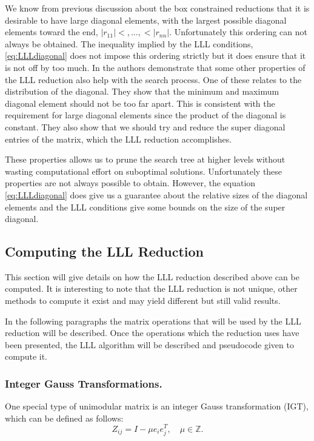 \documentclass[12pt,Bold,letterpaper]{mcgilletdclass}
\newcommand{\vsp}{\vspace{\baselineskip}}
\begin{document}
We know from previous discussion
about the box constrained reductions that it is desirable to have large diagonal
elements, with the largest possible diagonal elements toward the end, $|r_{11}|
<, \dots,< |r_{nn}|$. Unfortunately this ordering can not always be obtained. The inequality implied by the LLL conditions, \eqref{eq:LLLdiagonal} does not impose this ordering strictly but it does ensure that it is not off by too much. In \cite{XieCB11} the authors demonstrate that some other properties of the LLL reduction also help with the search process. One of these relates to the distribution of the diagonal. They show that the minimum and maximum diagonal element should not be too far apart. This is consistent with the requirement for large diagonal elements since the product of the diagonal is constant. They also show that we should try and reduce the super diagonal entries of the matrix, which the LLL reduction accomplishes. 

These properties allows us to prune the search
tree at higher levels without wasting computational effort on suboptimal
solutions. Unfortunately these properties are not always possible to obtain.
However, the equation \eqref{eq:LLLdiagonal} does give us a guarantee about the
relative sizes of the diagonal elements and the LLL conditions give some bounds
on the size of the super diagonal.

\vsp \subsection{Computing the LLL Reduction}

This section will give details on how the LLL reduction described above can be
computed. It is interesting to note that the LLL reduction is not unique, other
methods to compute it exist and may yield different but still valid results.

In the following paragraphs the matrix operations that will be used by the LLL
reduction will be described. Once the operations which the reduction uses have
been presented, the LLL algorithm will be described and pseudocode given to
compute it.

\vsp \subsubsection{Integer Gauss Transformations.} \label{subsec:IGT}

One special type of unimodular matrix is an integer Gauss transformation (IGT), which can be defined as follows:
\begin{equation}
Z_{ij} = I-\mu e_ie_j^T, \quad \mu \in \mathbb{Z}.
\end{equation}
\end{document}
